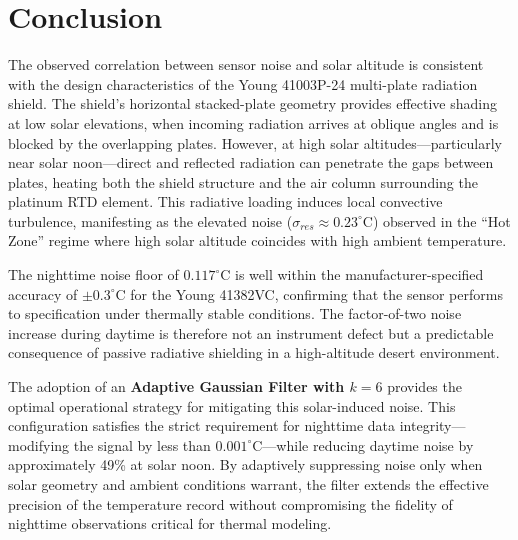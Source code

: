 \documentclass{article}
\begin{document}
\section{Conclusion}

The observed correlation between sensor noise and solar altitude is consistent with the design characteristics of the Young 41003P-24 multi-plate radiation shield. The shield's horizontal stacked-plate geometry provides effective shading at low solar elevations, when incoming radiation arrives at oblique angles and is blocked by the overlapping plates. However, at high solar altitudes---particularly near solar noon---direct and reflected radiation can penetrate the gaps between plates, heating both the shield structure and the air column surrounding the platinum RTD element. This radiative loading induces local convective turbulence, manifesting as the elevated noise ($\sigma_{res} \approx 0.23^\circ$C) observed in the ``Hot Zone'' regime where high solar altitude coincides with high ambient temperature.

The nighttime noise floor of $0.117^\circ$C is well within the manufacturer-specified accuracy of $\pm 0.3^\circ$C for the Young 41382VC, confirming that the sensor performs to specification under thermally stable conditions. The factor-of-two noise increase during daytime is therefore not an instrument defect but a predictable consequence of passive radiative shielding in a high-altitude desert environment.

The adoption of an \textbf{Adaptive Gaussian Filter with $k=6$} provides the optimal operational strategy for mitigating this solar-induced noise. This configuration satisfies the strict requirement for nighttime data integrity---modifying the signal by less than $0.001^\circ$C---while reducing daytime noise by approximately 49\% at solar noon. By adaptively suppressing noise only when solar geometry and ambient conditions warrant, the filter extends the effective precision of the temperature record without compromising the fidelity of nighttime observations critical for thermal modeling.
\end{document}
